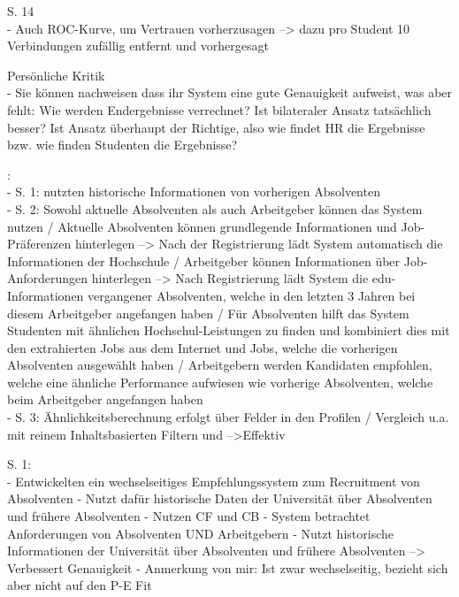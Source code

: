 S. 14\\
- Auch ROC-Kurve, um Vertrauen vorherzusagen --> dazu pro Student 10 Verbindungen zufällig entfernt und vorhergesagt

Persönliche Kritik\\
- Sie können nachweisen dass ihr System eine gute Genauigkeit aufweist, was aber fehlt: Wie werden Endergebnisse verrechnet? Ist bilateraler Ansatz tatsächlich besser? Ist Ansatz überhaupt der Richtige, also wie findet HR die Ergebnisse bzw. wie finden Studenten die Ergebnisse?

\textcite{ding:2016}:\\
- S. 1: nutzten historische Informationen von vorherigen Absolventen\\
- S. 2: Sowohl aktuelle Absolventen als auch Arbeitgeber können das System nutzen / Aktuelle Absolventen können grundlegende Informationen und Job-Präferenzen hinterlegen --> Nach der Registrierung lädt System automatisch die Informationen der Hochschule / Arbeitgeber können Informationen über Job-Anforderungen hinterlegen --> Nach Registrierung lädt System die edu-Informationen vergangener Absolventen, welche in den letzten 3 Jahren bei diesem Arbeitgeber angefangen haben / Für Absolventen hilft das System Studenten mit ähnlichen Hochschul-Leistungen zu finden und kombiniert dies mit den extrahierten Jobs aus dem Internet und Jobs, welche die vorherigen Absolventen ausgewählt haben / Arbeitgebern werden Kandidaten empfohlen, welche eine ähnliche Performance aufwiesen wie vorherige Absolventen, welche beim Arbeitgeber angefangen haben\\
- S. 3: Ähnlichkeitsberechnung erfolgt über Felder in den Profilen / Vergleich u.a. mit reinem Inhaltsbasierten Filtern und \textcite{hong:2013} -->Effektiv

S. 1:\\
- Entwickelten ein wechselseitiges Empfehlungssystem zum Recruitment von Absolventen
- Nutzt dafür historische Daten der Universität über Absolventen und frühere Absolventen
- Nutzen CF und CB
- System betrachtet Anforderungen von Absolventen UND Arbeitgebern
- Nutzt historische Informationen der Universität über Absolventen und frühere Absolventen --> Verbessert Genauigkeit
- Anmerkung von mir: Ist zwar wechselseitig, bezieht sich aber nicht auf den P-E Fit

